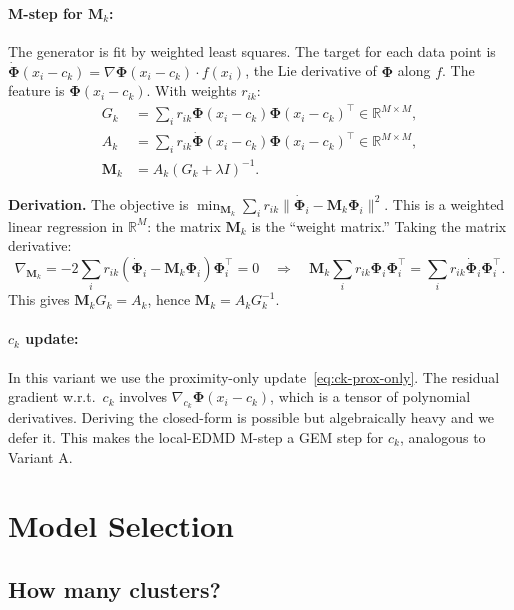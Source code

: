 \documentclass[11pt]{article}
\theoremstyle{definition}
\theoremstyle{plain}
\theoremstyle{remark}
\newcommand{\R}{\mathbb{R}}
\newcommand{\Mv}{\boldsymbol{M}}
\newcommand{\Phiv}{\boldsymbol{\Phi}}
\newenvironment{derivation}{\par\medskip\noindent\textbf{Derivation.} }{\par\medskip}
\begin{document}
\paragraph{M-step for $\Mv_k$:} The generator is fit by weighted least squares. The target for each data point is $\dot{\Phiv}(x_i-c_k)=\nabla\Phiv(x_i-c_k)\cdot f(x_i)$, the Lie derivative of $\Phiv$ along $f$. The feature is $\Phiv(x_i-c_k)$. With weights $r_{ik}$:
\begin{align}
  G_k &= \sum_i r_{ik}\Phiv(x_i-c_k)\Phiv(x_i-c_k)^\top \in\R^{M\times M}, \label{eq:edmd-G} \\
  A_k &= \sum_i r_{ik}\dot{\Phiv}(x_i-c_k)\Phiv(x_i-c_k)^\top \in\R^{M\times M}, \label{eq:edmd-A} \\
  \Mv_k &= A_k(G_k+\lambda I)^{-1}. \label{eq:edmd-Mk}
\end{align}

\begin{derivation}
The objective is $\min_{\Mv_k}\sum_i r_{ik}\|\dot{\Phiv}_i-\Mv_k\Phiv_i\|^2$. This is a weighted linear regression in $\R^M$: the matrix $\Mv_k$ is the ``weight matrix.'' Taking the matrix derivative:
\[
  \nabla_{\Mv_k} = -2\sum_i r_{ik}(\dot{\Phiv}_i-\Mv_k\Phiv_i)\Phiv_i^\top = 0 \quad\Longrightarrow\quad \Mv_k\sum_i r_{ik}\Phiv_i\Phiv_i^\top = \sum_i r_{ik}\dot{\Phiv}_i\Phiv_i^\top.
\]
This gives $\Mv_k G_k = A_k$, hence $\Mv_k = A_k G_k^{-1}$.
\end{derivation}

\paragraph{$c_k$ update:} In this variant we use the proximity-only update~\eqref{eq:ck-prox-only}. The residual gradient w.r.t.\ $c_k$ involves $\nabla_{c_k}\Phiv(x_i-c_k)$, which is a tensor of polynomial derivatives. Deriving the closed-form is possible but algebraically heavy and we defer it. This makes the local-EDMD M-step a GEM step for $c_k$, analogous to Variant A.

\section{Model Selection}\label{sec:model-selection}

\subsection{How many clusters?}
\end{document}
